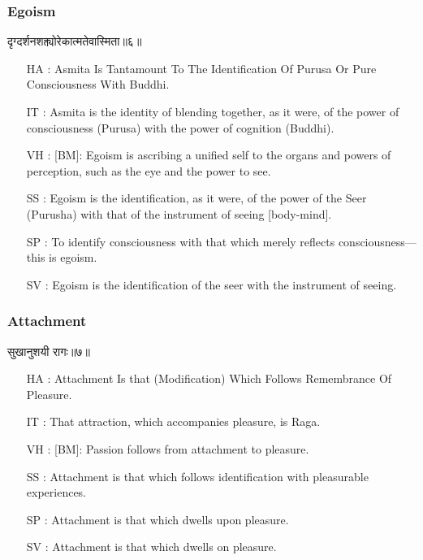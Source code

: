 \begin{frame}[fragile]\frametitle{Egoism}
\begin{sanskrit}
दृग्दर्शनशक्त्योरेकात्मतेवास्मिता॥६॥
\end{sanskrit}

	\begin{itemize}
	\item [HA]: Asmita Is Tantamount To The Identification Of Purusa Or Pure Consciousness With Buddhi.
	\item [IT]: Asmita is the identity of blending together, as it were, of the power of consciousness (Purusa) with the power of cognition (Buddhi).
	\item [VH]: [BM]: Egoism is ascribing a unified self to the organs and powers of perception, such as the eye and the power to see.
	\item [SS]: Egoism is the identification, as it were, of the power of the Seer (Purusha) with that of the instrument of seeing [body-mind].
	\item [SP]: To identify consciousness with that which merely reflects consciousness—this is egoism.
	\item [SV]: Egoism is the identification of the seer with the instrument of seeing. 
	\end{itemize}
\end{frame}



\begin{frame}[fragile]\frametitle{Attachment}
\begin{sanskrit}
सुखानुशयी रागः॥७॥
\end{sanskrit}

	\begin{itemize}
	\item [HA]: Attachment Is that (Modification) Which Follows Remembrance Of Pleasure.
	\item [IT]: That attraction, which accompanies pleasure, is Raga.
	\item [VH]: [BM]: Passion follows from attachment to pleasure.
	\item [SS]: Attachment is that which follows identification with pleasurable experiences.
	\item [SP]: Attachment is that which dwells upon pleasure.
	\item [SV]: Attachment is that which dwells on pleasure. 
	\end{itemize}
\end{frame}




